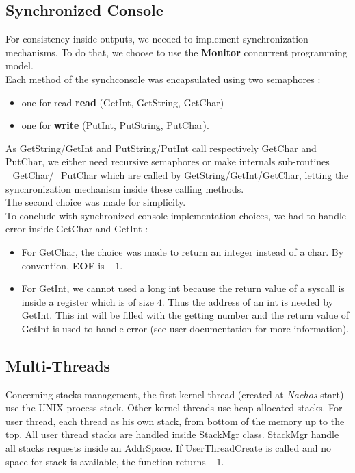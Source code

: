 \subsection{Synchronized Console}

For consistency inside outputs, we needed to implement synchronization
mechanisms. To do that, we choose to use the \textbf{Monitor} concurrent
programming model.\\
Each method of the synchconsole was encapsulated using two
semaphores :
\begin{itemize}
    \item one for read \textbf{read} (GetInt, GetString, GetChar)
    \item one for \textbf{write} (PutInt, PutString, PutChar).
\end{itemize}

As GetString/GetInt and PutString/PutInt call respectively GetChar and PutChar,
we either need recursive semaphores or make internals sub-routines
\_GetChar/\_PutChar which are called by GetString/GetInt/GetChar, letting the
synchronization mechanism inside these calling methods.\\
The second choice was made for simplicity.\\

To conclude with synchronized console implementation choices, we had to handle
error inside GetChar and GetInt :
\begin{itemize}
    \item For GetChar, the choice was made to return an integer instead of a char. By
convention, \textbf{EOF} is $-1$.
    \item For GetInt, we cannot used a long int because the return value of a syscall is
inside a register which is of size $4$. Thus the address of an int is needed by
GetInt. This int will be filled with the getting number and the return value of
GetInt is used to handle error (see user documentation for more information).
\end{itemize}

\subsection{Multi-Threads}

Concerning stacks management, the first kernel thread (created at \emph{Nachos}
start) use the UNIX-process stack. Other kernel threads use heap-allocated
stacks. For user thread, each thread as his own stack, from bottom of the memory
up to the top. All user thread stacks are handled inside StackMgr class.
StackMgr handle all stacks requests inside an AddrSpace. If UserThreadCreate is
called and no space for stack is available, the function returns $-1$.\\

